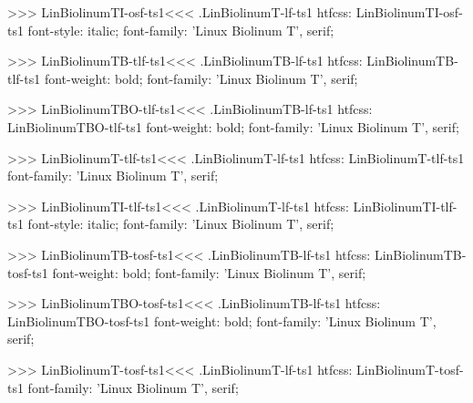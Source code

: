 {{{{{{{>>>
\<LinBiolinumTI-osf-ts1\><<<
.LinBiolinumT-lf-ts1
htfcss:  LinBiolinumTI-osf-ts1  font-style: italic; font-family: 'Linux Biolinum T', serif;

>>>
\<LinBiolinumTB-tlf-ts1\><<<
.LinBiolinumTB-lf-ts1
htfcss:  LinBiolinumTB-tlf-ts1  font-weight: bold; font-family: 'Linux Biolinum T', serif;

>>>
\<LinBiolinumTBO-tlf-ts1\><<<
.LinBiolinumTB-lf-ts1
htfcss:  LinBiolinumTBO-tlf-ts1  font-weight: bold; font-family: 'Linux Biolinum T', serif;

>>>
\<LinBiolinumT-tlf-ts1\><<<
.LinBiolinumT-lf-ts1
htfcss:  LinBiolinumT-tlf-ts1  font-family: 'Linux Biolinum T', serif;

>>>
\<LinBiolinumTI-tlf-ts1\><<<
.LinBiolinumT-lf-ts1
htfcss:  LinBiolinumTI-tlf-ts1  font-style: italic; font-family: 'Linux Biolinum T', serif;

>>>
\<LinBiolinumTB-tosf-ts1\><<<
.LinBiolinumTB-lf-ts1
htfcss:  LinBiolinumTB-tosf-ts1  font-weight: bold; font-family: 'Linux Biolinum T', serif;

>>>
\<LinBiolinumTBO-tosf-ts1\><<<
.LinBiolinumTB-lf-ts1
htfcss:  LinBiolinumTBO-tosf-ts1  font-weight: bold; font-family: 'Linux Biolinum T', serif;

>>>
\<LinBiolinumT-tosf-ts1\><<<
.LinBiolinumT-lf-ts1
htfcss:  LinBiolinumT-tosf-ts1  font-family: 'Linux Biolinum T', serif;

}}}}}}}

